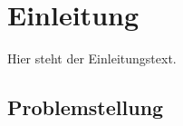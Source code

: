 \newpage

\section{Einleitung} \label{einleitung}
Hier steht der Einleitungstext.
\subsection{Problemstellung} \label{problemstellung}
